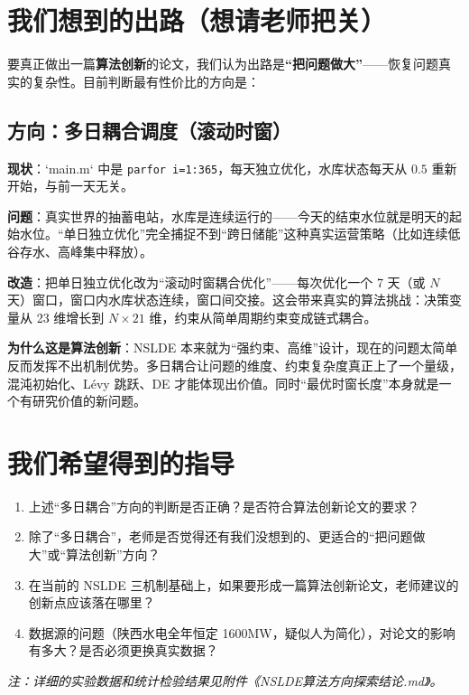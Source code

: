 \documentclass[11pt,a4paper]{ctexart}
\begin{document}
\section{我们想到的出路（想请老师把关）}

要真正做出一篇\textbf{算法创新}的论文，我们认为出路是\textbf{``把问题做大''}——恢复问题真实的复杂性。目前判断最有性价比的方向是：

\subsection{方向：多日耦合调度（滚动时窗）}

\textbf{现状}：`main.m` 中是 \texttt{parfor i=1:365}，每天独立优化，水库状态每天从 $0.5$ 重新开始，与前一天无关。

\textbf{问题}：真实世界的抽蓄电站，水库是连续运行的——今天的结束水位就是明天的起始水位。``单日独立优化''完全捕捉不到``跨日储能''这种真实运营策略（比如连续低谷存水、高峰集中释放）。

\textbf{改造}：把单日独立优化改为``滚动时窗耦合优化''——每次优化一个 7 天（或 $N$ 天）窗口，窗口内水库状态连续，窗口间交接。这会带来真实的算法挑战：决策变量从 23 维增长到 $N\times 21$ 维，约束从简单周期约束变成链式耦合。

\textbf{为什么这是算法创新}：NSLDE 本来就为``强约束、高维''设计，现在的问题太简单反而发挥不出机制优势。多日耦合让问题的维度、约束复杂度真正上了一个量级，混沌初始化、Lévy 跳跃、DE 才能体现出价值。同时``最优时窗长度''本身就是一个有研究价值的新问题。

\section{我们希望得到的指导}

\begin{enumerate}[itemsep=0.3em]
  \item 上述``多日耦合''方向的判断是否正确？是否符合算法创新论文的要求？
  \item 除了``多日耦合''，老师是否觉得还有我们没想到的、更适合的``把问题做大''或``算法创新''方向？
  \item 在当前的 NSLDE 三机制基础上，如果要形成一篇算法创新论文，老师建议的创新点应该落在哪里？
  \item 数据源的问题（陕西水电全年恒定 1600MW，疑似人为简化），对论文的影响有多大？是否必须更换真实数据？
\end{enumerate}

\vspace{1em}
\small
\textit{注：详细的实验数据和统计检验结果见附件《NSLDE算法方向探索结论.md》。}
\end{document}
